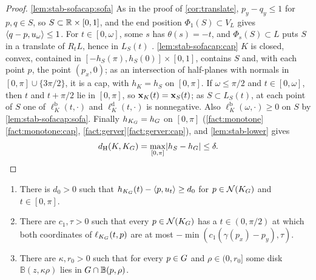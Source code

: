 \begin{proof}
\ref{lem:stab-sofacap:sofa} As in the proof of \cref{cor:translate},
$p_y-q_y\le1$ for $p,q\in S$, so $S\subset\mathbb{R}\times[0,1]$, and the end position
$\Phi_1(S)\subset V_L$ gives $\langle q-p,u_\omega\rangle\le1$. For $t\in[0,\omega]$,
some $s$ has $\theta(s)=-t$, and $\Phi_s(S)\subset L$ puts $S$ in a translate
of $R_tL$, hence in $L_S(t)$ .
\ref{lem:stab-sofacap:cap} $K$ is closed, convex, contained in
$[-h_S(\pi),h_S(0)]\times[0,1]$, contains $S$ and, with each point $p$, the
point $(p_x,0)$; as an intersection of half-planes with normals in
$[0,\pi]\cup\{3\pi/2\}$, it is a cap, with $h_K=h_S$ on $[0,\pi]$. If
$\omega\le\pi/2$ and $t\in[0,\omega]$, then $t$ and $t+\pi/2$ lie in
$[0,\pi]$, so $\mathbf{x}_K(t)=\mathbf{x}_S(t)$; as $S\subset L_S(t)$, at each point of $S$
one of $\ell^{\mathrm b}_K(t,\cdot)$ and $\ell^{\mathrm d}_K(t,\cdot)$ is
nonnegative. Also $\ell^{\mathrm b}_K(\omega,\cdot)\ge0$ on $S$ by
\ref{lem:stab-sofacap:sofa}. Finally $h_{K_G}=h_G$ on $[0,\pi]$
(\cref{fact:monotone}\ref{fact:monotone:cap},
\cref{fact:gerver}\ref{fact:gerver:cap}), and \cref{lem:stab-lower} gives
\[
  d_{\mathrm{H}}(K,K_G)=\max_{[0,\pi]}\lvert h_S-h_G\rvert\le\delta.\qedhere
\]
\end{proof}

\begin{lemma}\label{lem:stab-margins}
\begin{enumerate}[label=(\alph*)]
\item\label{lem:stab-margins:outer} There is $d_0>0$ such that
$h_{K_G}(t)-\langle p,u_t\rangle\ge d_0$ for $p\in\mathcal{N}(K_G)$ and $t\in[0,\pi]$.
\item\label{lem:stab-margins:roof} There are $c_1,\tau>0$ such that every
$p\in\mathcal{N}(K_G)$ has a $t\in(0,\pi/2)$ at which both coordinates of
$\ell_{K_G}(t,p)$ are at most $-\min(c_1(\gamma(p_x)-p_y),\tau)$.
\item\label{lem:stab-margins:balls} There are $\kappa,r_0>0$ such that for
every $p\in G$ and $\rho\in(0,r_0]$ some disk $\mathbb B(z,\kappa\rho)$ lies
in $G\cap\mathbb B(p,\rho)$.
\end{enumerate}
\end{lemma}

